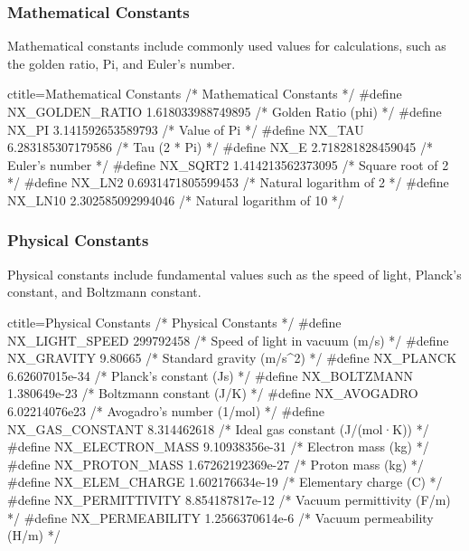 \newpage
\subsubsection{Mathematical Constants}
\label{Mathematical Constants}
\begin{NexMainBox}
	\begin{NexMainBox}
		Mathematical constants include commonly used values for calculations, such as the golden ratio, Pi, and Euler's number.
	\end{NexMainBox}
\end{NexMainBox}

\begin{NexCodeBox}{c}{title={Mathematical Constants}}
/* Mathematical Constants */
#define NX_GOLDEN_RATIO 1.618033988749895	/* Golden Ratio (phi) */
#define NX_PI 3.141592653589793			/* Value of Pi */
#define NX_TAU 6.283185307179586		/* Tau (2 * Pi) */
#define NX_E 2.718281828459045			/* Euler's number */
#define NX_SQRT2 1.414213562373095		/* Square root of 2 */
#define NX_LN2 0.6931471805599453		/* Natural logarithm of 2 */
#define NX_LN10 2.302585092994046		/* Natural logarithm of 10 */
\end{NexCodeBox}

\newpage
\subsubsection{Physical Constants}
\label{Physical Constants}
\begin{NexMainBox}
	\begin{NexMainBox}
		Physical constants include fundamental values such as the speed of light, Planck's constant, and Boltzmann constant.
	\end{NexMainBox}
\end{NexMainBox}

\begin{NexCodeBox}{c}{title={Physical Constants}}
/* Physical Constants */
#define NX_LIGHT_SPEED 299792458		/* Speed of light in vacuum (m/s) */
#define NX_GRAVITY 9.80665			/* Standard gravity (m/s^2) */
#define NX_PLANCK 6.62607015e-34		/* Planck's constant (Js) */
#define NX_BOLTZMANN 1.380649e-23		/* Boltzmann constant (J/K) */
#define NX_AVOGADRO 6.02214076e23		/* Avogadro's number (1/mol) */
#define NX_GAS_CONSTANT 8.314462618		/* Ideal gas constant (J/(mol·K)) */
#define NX_ELECTRON_MASS 9.10938356e-31		/* Electron mass (kg) */
#define NX_PROTON_MASS 1.67262192369e-27	/* Proton mass (kg) */
#define NX_ELEM_CHARGE 1.602176634e-19		/* Elementary charge (C) */
#define NX_PERMITTIVITY 8.854187817e-12		/* Vacuum permittivity (F/m) */
#define NX_PERMEABILITY 1.2566370614e-6		/* Vacuum permeability (H/m) */
\end{NexCodeBox}

